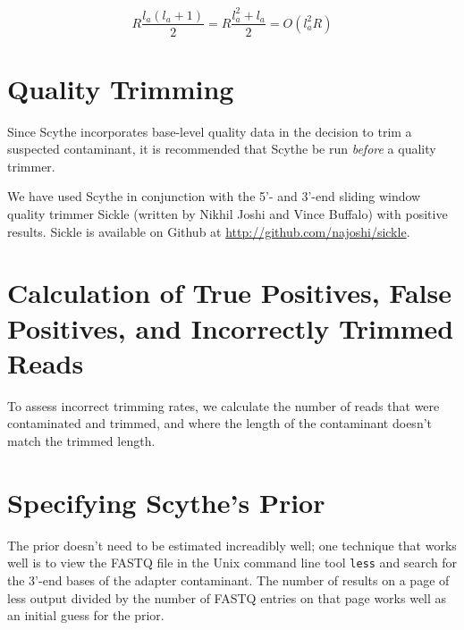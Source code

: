 \documentclass{bioinfo}
\begin{document}
$$ R \frac{l_a(l_a + 1)}{2} = R \frac{l_a^2 + l_a}{2} = O(l_a^2 R)$$

\section{Quality Trimming}

Since Scythe incorporates base-level quality data in the decision to
trim a suspected contaminant, it is recommended that Scythe be run
\emph{before} a quality trimmer.

We have used Scythe in conjunction with the 5'- and 3'-end sliding
window quality trimmer Sickle (written by Nikhil Joshi and Vince
Buffalo) with positive results. Sickle is available on Github at
\href{http://github.com/najoshi/sickle}{http://github.com/najoshi/sickle}.

\section{Calculation of True Positives, False Positives, and
  Incorrectly Trimmed Reads}

To assess incorrect trimming rates, we calculate the number of reads
that were contaminated and trimmed, and where the length of the
contaminant doesn't match the trimmed length.

\section{Specifying Scythe's Prior}

The prior doesn't need to be estimated increadibly well; one technique
that works well is to view the FASTQ file in the Unix command line
tool \texttt{less} and search for the 3'-end bases of the adapter
contaminant. The number of results on a page of less output divided by
the number of FASTQ entries on that page works well as an initial
guess for the prior.





\end{document}
